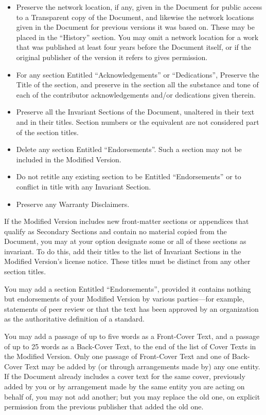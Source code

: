 \documentclass[a4paper,openany]{book}
\begin{document}
\begin{results}
\begin{itemize}
\item[J.]
 Preserve the network location, if any, given in the Document for
 public access to a Transparent copy of the Document, and likewise
 the network locations given in the Document for previous versions
 it was based on. These may be placed in the ``History'' section.
 You may omit a network location for a work that was published at
 least four years before the Document itself, or if the original
 publisher of the version it refers to gives permission.

\item[K.]
 For any section Entitled ``Acknowledgements'' or ``Dedications'',
 Preserve the Title of the section, and preserve in the section all
 the substance and tone of each of the contributor acknowledgements
 and/or dedications given therein.

\item[L.]
 Preserve all the Invariant Sections of the Document,
 unaltered in their text and in their titles. Section numbers
 or the equivalent are not considered part of the section titles.

\item[M.]
 Delete any section Entitled ``Endorsements''. Such a section
 may not be included in the Modified Version.

\item[N.]
 Do not retitle any existing section to be Entitled ``Endorsements''
 or to conflict in title with any Invariant Section.

\item[O.]
 Preserve any Warranty Disclaimers.
\end{itemize}

If the Modified Version includes new front-matter sections or
appendices that qualify as Secondary Sections and contain no material
copied from the Document, you may at your option designate some or all
of these sections as invariant. To do this, add their titles to the
list of Invariant Sections in the Modified Version's license notice.
These titles must be distinct from any other section titles.

You may add a section Entitled ``Endorsements'', provided it contains
nothing but endorsements of your Modified Version by various
parties---for example, statements of peer review or that the text has
been approved by an organization as the authoritative definition of a
standard.

You may add a passage of up to five words as a Front-Cover Text, and a
passage of up to 25 words as a Back-Cover Text, to the end of the list
of Cover Texts in the Modified Version. Only one passage of
Front-Cover Text and one of Back-Cover Text may be added by (or
through arrangements made by) any one entity. If the Document already
includes a cover text for the same cover, previously added by you or
by arrangement made by the same entity you are acting on behalf of,
you may not add another; but you may replace the old one, on explicit
permission from the previous publisher that added the old one.


\end{results}
\end{document}
